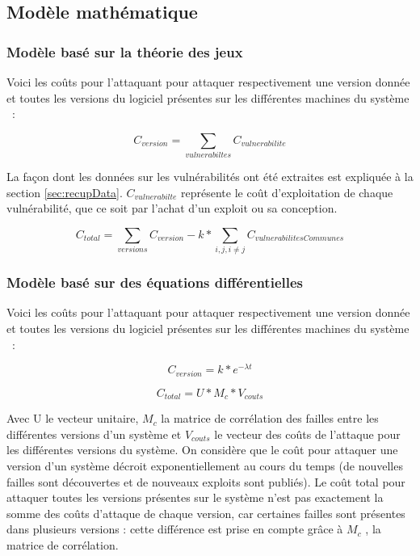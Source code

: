 \subsection{Modèle mathématique}\label{sec:modelMath}

\subsubsection{Modèle basé sur la théorie des jeux}

Voici les coûts pour l'attaquant pour attaquer respectivement une version donnée et toutes les versions du logiciel présentes sur les différentes machines du système ~:

\[
	C_{version} = \sum_{vulnerabiltes} C_{vulnerabilite}
\]

La façon dont les données sur les vulnérabilités ont été extraites est expliquée à la section \ref{sec:recupData}.  $C_{vulnerabilte}$ représente le coût d'exploitation de chaque vulnérabilité, que ce soit par l'achat d'un exploit ou sa conception.
 
\[
	C_{total} = \sum_{versions} C_{version} - k *\sum_{i,j,i \neq j} C_{vulnerabilitesCommunes}
\]




\subsubsection{Modèle basé sur des équations différentielles}

Voici les coûts pour l'attaquant pour attaquer respectivement une version donnée et toutes les versions du logiciel présentes sur les différentes machines du système ~:

\[
	C_{version} = k*e^{- \lambda t}
\]

\[
	C_{total} = U * M_{c} * V_{couts}
\]

Avec U le vecteur unitaire, $M_c$ la matrice de corrélation des failles entre les différentes versions d'un système et $V_{couts}$ le vecteur des coûts de l'attaque pour les différentes versions du système.
On considère que le coût pour attaquer une version d'un système décroit exponentiellement au cours du temps (de nouvelles failles sont découvertes et de nouveaux exploits sont publiés). Le coût total pour attaquer toutes les versions présentes sur le système n'est pas exactement la somme des coûts d'attaque de chaque version, car certaines failles sont présentes dans plusieurs versions : cette différence est prise en compte grâce à $M_c$ , la matrice de corrélation.


